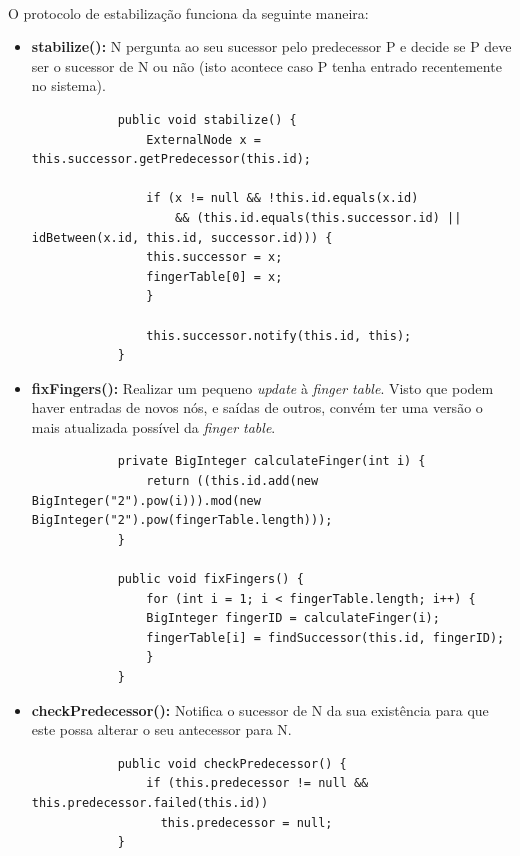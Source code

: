 \documentclass[11pt,oneside]{book}
\begin{document}
    \paragraph{}
    O protocolo de estabilização funciona da seguinte maneira:
    \begin{itemize}
        \item \textbf{stabilize():} N pergunta ao seu sucessor pelo predecessor P e decide se P deve 
        ser o sucessor de N ou não (isto acontece caso P tenha entrado recentemente no sistema).
        \begin{lstlisting}
            public void stabilize() {
                ExternalNode x = this.successor.getPredecessor(this.id);

                if (x != null && !this.id.equals(x.id)
                    && (this.id.equals(this.successor.id) || idBetween(x.id, this.id, successor.id))) {
                this.successor = x;
                fingerTable[0] = x;
                }

                this.successor.notify(this.id, this);
            }
        \end{lstlisting}

        \item \textbf{fixFingers():} Realizar um pequeno \textit{update} à \textit{finger table}.
        Visto que podem haver entradas de novos nós, e saídas de outros, convém ter uma versão o
        mais atualizada possível da \textit{finger table}.
        
        \begin{lstlisting}
            private BigInteger calculateFinger(int i) {
                return ((this.id.add(new BigInteger("2").pow(i))).mod(new BigInteger("2").pow(fingerTable.length)));
            }

            public void fixFingers() {
                for (int i = 1; i < fingerTable.length; i++) {
                BigInteger fingerID = calculateFinger(i);
                fingerTable[i] = findSuccessor(this.id, fingerID);
                }
            }
        \end{lstlisting}

        \item \textbf{checkPredecessor():} Notifica o sucessor de N da sua existência para que 
        este possa alterar o seu antecessor para N. 
        \begin{lstlisting}
            public void checkPredecessor() {
                if (this.predecessor != null && this.predecessor.failed(this.id))
                  this.predecessor = null;
            }
        \end{lstlisting}

    \end{itemize}        
\end{document}
